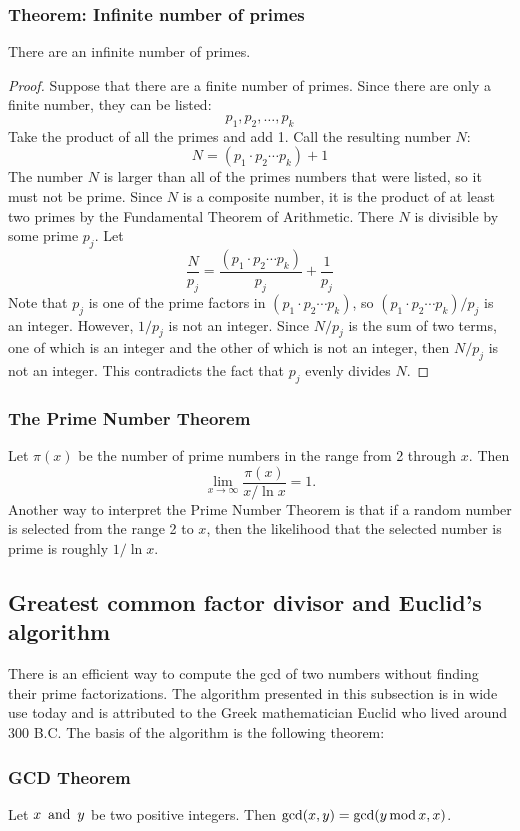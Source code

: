 \subsubsection*{Theorem: Infinite number of primes}
There are an infinite number of primes.
\begin{proof}
    Suppose that there are a finite number of primes. Since there are only a finite number, they can be listed:
    \[
        p_1,p_2,\ldots,p_k
    \]
    Take the product of all the primes and add 1. Call the resulting number $N$:
    \[
        N = (p_1 \cdot p_2 \cdots p_k) + 1
    \]
    The number $N$ is larger than all of the primes numbers that were listed, so it must not be prime. Since $N$ is a composite number, it is the product of at least two primes by the Fundamental Theorem of Arithmetic. There $N$ is divisible by some prime $p_j$. Let
    \[
        \frac{N}{p_j} = \frac{(p_1 \cdot p_2 \cdots p_k)}{p_j} + \frac{1}{p_j}
    \]
    Note that $p_j$ is one of the prime factors in $(p_1 \cdot p_2 \cdots p_k)$, so $(p_1 \cdot p_2 \cdots p_k)/p_j$ is an integer. However, $1/p_j$ is not an integer. Since $N/p_j$ is the sum of two terms, one of which is an integer and the other of which is not an integer, then $N/p_j$ is not an integer. This contradicts the fact that $p_j$ evenly divides $N$.
\end{proof}

\subsubsection*{The Prime Number Theorem}
Let $\pi(x)$ be the number of prime numbers in the range from 2 through $x$. Then
\[
    \lim_{x \rightarrow \infty} \frac{\pi(x)}{x/\ln x} = 1.
\]
Another way to interpret the Prime Number Theorem is that if a random number is selected from the range 2 to $x$, then the likelihood that the selected number is prime is roughly $1/\ln x$.

\subsection{Greatest common factor divisor and Euclid's algorithm}
There is an efficient way to compute the gcd of two numbers without finding their prime factorizations. The algorithm presented in this subsection is in wide use today and is attributed to the Greek mathematician Euclid who lived around 300 B.C. The basis of the algorithm is the following theorem:

\subsubsection*{GCD Theorem}
Let $x \operatorname{~\text{and}~} y$ be two positive integers. Then $\gcd(x,y) = \gcd(y \operatorname{\text{mod}} x, x)$.

